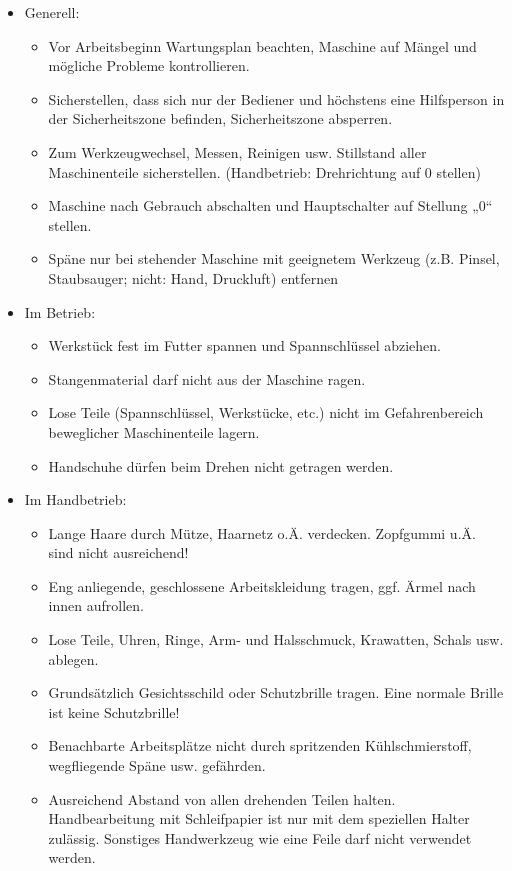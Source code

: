 \documentclass[fontsize=9pt]{scrartcl}
\newenvironment{smallitemize}{\begin{itemize}\itemsep -3pt}{\end{itemize}}
\begin{document}
\begin{itemize}
	\item Generell:
	\begin{smallitemize}
		\item Vor Arbeitsbeginn Wartungsplan beachten, Maschine auf Mängel und mögliche Probleme kontrollieren.
		\item Sicherstellen, dass sich nur der Bediener und höchstens eine Hilfsperson in der Sicherheitszone befinden, Sicherheitszone absperren.
		\item Zum Werkzeugwechsel, Messen, Reinigen usw. Stillstand aller Maschinenteile sicherstellen. (Handbetrieb: Drehrichtung auf 0 stellen)
		\item Maschine nach Gebrauch abschalten und Hauptschalter auf Stellung „0“ stellen.
		\item Späne nur bei stehender Maschine mit geeignetem Werkzeug (z.B. Pinsel, Staubsauger; nicht: Hand, Druckluft) entfernen
		
	\end{smallitemize}
	\item Im Betrieb:
	\begin{smallitemize}
		\item Werkstück fest im Futter spannen und Spannschlüssel abziehen.
		\item Stangenmaterial darf nicht aus der Maschine ragen.
		\item Lose Teile (Spannschlüssel, Werkstücke, etc.) nicht im Gefahrenbereich beweglicher Maschinenteile lagern.
		\item Handschuhe dürfen beim Drehen nicht getragen werden.
		
	\end{smallitemize}
	\item Im Handbetrieb:
	\begin{smallitemize}
		\item Lange Haare durch Mütze, Haarnetz o.Ä. verdecken. Zopfgummi u.Ä. sind nicht ausreichend!
		\item Eng anliegende, geschlossene Arbeitskleidung tragen, ggf. Ärmel nach innen aufrollen.
		\item Lose Teile, Uhren,  Ringe, Arm- und Halsschmuck, Krawatten, Schals usw. ablegen.
		\item Grundsätzlich Gesichtsschild oder Schutzbrille tragen. Eine normale Brille ist keine Schutzbrille!
		\item Benachbarte Arbeitsplätze nicht durch spritzenden Kühlschmierstoff, wegfliegende Späne usw. gefährden.
		\item Ausreichend Abstand von allen drehenden Teilen halten. Handbearbeitung mit Schleifpapier ist nur mit dem speziellen Halter zulässig. Sonstiges Handwerkzeug wie eine Feile darf nicht verwendet werden.
		\end{smallitemize}
\end{itemize}
\end{document}
